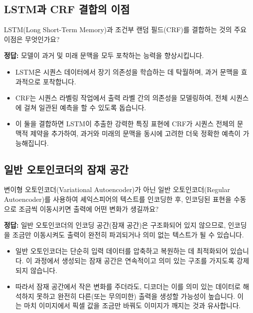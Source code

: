\documentclass[11pt,a4paper]{article}
\begin{document}
\subsection{LSTM과 CRF 결합의 이점}
\begin{conceptbox}[title={질문 2: LSTM과 CRF 결합의 이점}]
LSTM(Long Short-Term Memory)과 조건부 랜덤 필드(CRF)를 결합하는 것의 주요 이점은 무엇인가요?
\end{conceptbox}

\begin{summarybox}[title={정답 및 설명}]
\textbf{정답:} 모델이 과거 및 미래 문맥을 모두 포착하는 능력을 향상시킵니다.
\begin{itemize}
    \item LSTM은 시퀀스 데이터에서 장기 의존성을 학습하는 데 탁월하며, 과거 문맥을 효과적으로 포착합니다.
    \item CRF는 시퀀스 라벨링 작업에서 출력 라벨 간의 의존성을 모델링하여, 전체 시퀀스에 걸쳐 일관된 예측을 할 수 있도록 돕습니다.
    \item 이 둘을 결합하면 LSTM이 추출한 강력한 특징 표현에 CRF가 시퀀스 전체의 문맥적 제약을 추가하여, 과거와 미래의 문맥을 동시에 고려한 더욱 정확한 예측이 가능해집니다.
\end{itemize}
\end{summarybox}

\subsection{일반 오토인코더의 잠재 공간}
\begin{conceptbox}[title={질문 3: 일반 오토인코더의 잠재 공간}]
변이형 오토인코더(Variational Autoencoder)가 아닌 일반 오토인코더(Regular Autoencoder)를 사용하여 셰익스피어의 텍스트를 인코딩한 후, 인코딩된 표현을 수동으로 조금씩 이동시키면 출력에 어떤 변화가 생길까요?
\end{conceptbox}

\begin{summarybox}[title={정답 및 설명}]
\textbf{정답:} 일반 오토인코더의 인코딩 공간(잠재 공간)은 구조화되어 있지 않으므로, 인코딩을 조금만 이동시켜도 출력이 완전히 파괴되거나 의미 없는 텍스트가 될 수 있습니다.
\begin{itemize}
    \item 일반 오토인코더는 단순히 입력 데이터를 압축하고 복원하는 데 최적화되어 있습니다. 이 과정에서 생성되는 잠재 공간은 연속적이고 의미 있는 구조를 가지도록 강제되지 않습니다.
    \item 따라서 잠재 공간에서 작은 변화를 주더라도, 디코더는 이를 의미 있는 데이터로 해석하지 못하고 완전히 다른(또는 무의미한) 출력을 생성할 가능성이 높습니다. 이는 마치 이미지에서 픽셀 값을 조금만 바꿔도 이미지가 깨지는 것과 유사합니다.
\end{itemize}
\end{summarybox}
\end{document}

